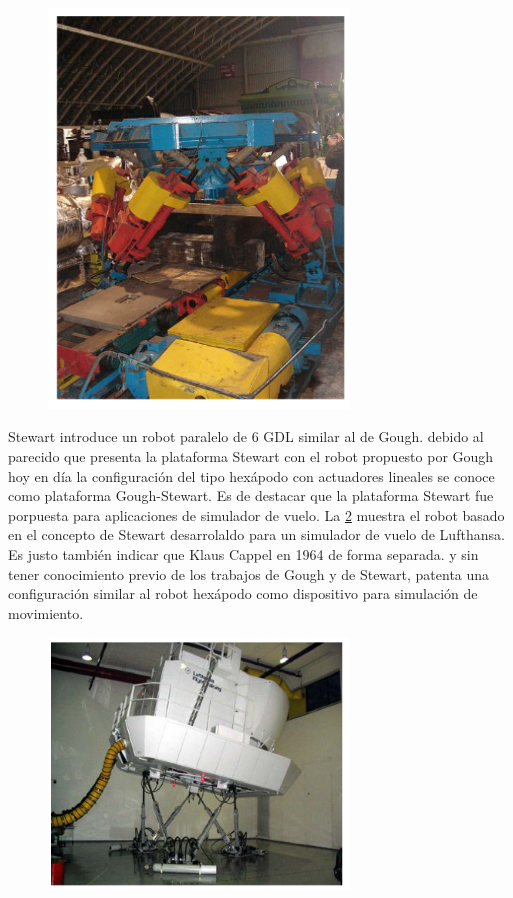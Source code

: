 \documentclass[letter,openrigh,12pt,spanish]{report}
\begin{document}
\begin{figure}[htp]
\centering
\includegraphics[width=8cm]{fi5.png}
\caption{}
\label{Figura 4}
\end{figure}

Stewart introduce un robot paralelo de 6 GDL similar al de Gough. debido al parecido que presenta la plataforma Stewart con el robot propuesto por Gough hoy en d\'ia la configuraci\'on del tipo hex\'apodo con actuadores lineales se conoce como plataforma Gough-Stewart. Es de destacar que la plataforma Stewart fue porpuesta para aplicaciones de simulador de vuelo. La \ref{Figura 3} muestra el robot basado en el concepto de Stewart desarrolaldo para un simulador de vuelo de Lufthansa. Es justo tambi\'en indicar que Klaus Cappel en 1964 de forma separada. y sin tener conocimiento previo de los trabajos de Gough y de Stewart, patenta una configuraci\'on similar al robot hex\'apodo como dispositivo para simulaci\'on de movimiento.

\begin{figure}[htp]
\centering
\includegraphics[width=8cm]{fi3.png}
\caption{}
\label{Figura 3}
\end{figure}
\end{document}
